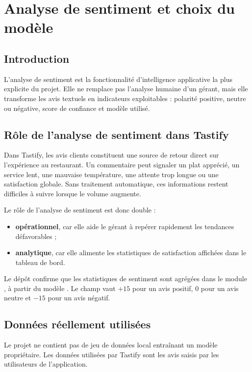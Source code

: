 \chapter{Analyse de sentiment et choix du modèle}
\label{chap:sentiment}

\section*{Introduction}
L'analyse de sentiment est la fonctionnalité d'intelligence applicative la plus explicite du projet. Elle ne remplace pas l'analyse humaine d'un gérant, mais elle transforme les avis textuels en indicateurs exploitables : polarité positive, neutre ou négative, score de confiance et modèle utilisé.

\section{Rôle de l'analyse de sentiment dans Tastify}
Dans Tastify, les avis clients constituent une source de retour direct sur l'expérience au restaurant. Un commentaire peut signaler un plat apprécié, un service lent, une mauvaise température, une attente trop longue ou une satisfaction globale. Sans traitement automatique, ces informations restent difficiles à suivre lorsque le volume augmente.

Le rôle de l'analyse de sentiment est donc double :

\begin{itemize}
  \item \textbf{opérationnel}, car elle aide le gérant à repérer rapidement les tendances défavorables ;
  \item \textbf{analytique}, car elle alimente les statistiques de satisfaction affichées dans le tableau de bord.
\end{itemize}

Le dépôt confirme que les statistiques de sentiment sont agrégées dans le module , à partir du modèle . Le champ  vaut $+15$ pour un avis positif, $0$ pour un avis neutre et $-15$ pour un avis négatif.

\section{Données réellement utilisées}
Le projet ne contient pas de jeu de données local entraînant un modèle propriétaire. Les données utilisées par Tastify sont les avis saisis par les utilisateurs de l'application.

